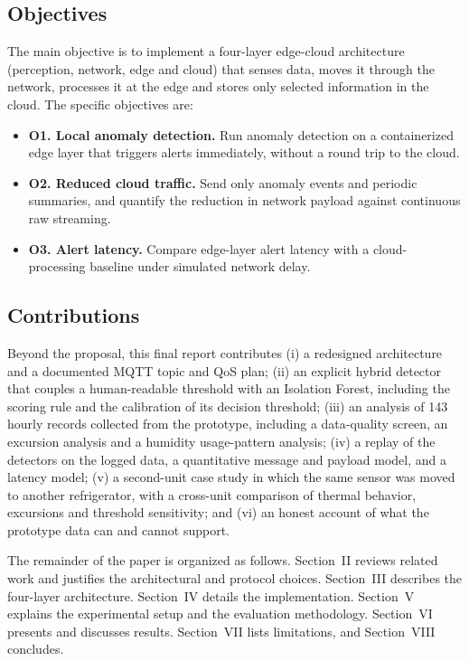 \documentclass[conference]{IEEEtran}
\begin{document}
\subsection{Objectives}
The main objective is to implement a four-layer edge-cloud architecture (perception, network, edge and cloud) that senses data, moves it through the network, processes it at the edge and stores only selected information in the cloud. The specific objectives are:
\begin{itemize}
\item \textbf{O1. Local anomaly detection.} Run anomaly detection on a containerized edge layer that triggers alerts immediately, without a round trip to the cloud.
\item \textbf{O2. Reduced cloud traffic.} Send only anomaly events and periodic summaries, and quantify the reduction in network payload against continuous raw streaming.
\item \textbf{O3. Alert latency.} Compare edge-layer alert latency with a cloud-processing baseline under simulated network delay.
\end{itemize}

\subsection{Contributions}
Beyond the proposal, this final report contributes (i) a redesigned architecture and a documented MQTT topic and QoS plan; (ii) an explicit hybrid detector that couples a human-readable threshold with an Isolation Forest, including the scoring rule and the calibration of its decision threshold; (iii) an analysis of 143 hourly records collected from the prototype, including a data-quality screen, an excursion analysis and a humidity usage-pattern analysis; (iv) a replay of the detectors on the logged data, a quantitative message and payload model, and a latency model; (v) a second-unit case study in which the same sensor was moved to another refrigerator, with a cross-unit comparison of thermal behavior, excursions and threshold sensitivity; and (vi) an honest account of what the prototype data can and cannot support.

The remainder of the paper is organized as follows. Section~II reviews related work and justifies the architectural and protocol choices. Section~III describes the four-layer architecture. Section~IV details the implementation. Section~V explains the experimental setup and the evaluation methodology. Section~VI presents and discusses results. Section~VII lists limitations, and Section~VIII concludes.
\end{document}
